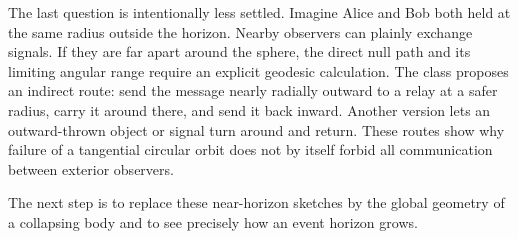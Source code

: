 The last question is intentionally less settled.  Imagine Alice and Bob both
held at the same radius outside the horizon.  Nearby observers can plainly
exchange signals.  If they are far apart around the sphere, the direct null
path and its limiting angular range require an explicit geodesic
calculation.  The class proposes an indirect route: send the message nearly
radially outward to a relay at a safer radius, carry it around there, and send
it back inward.  Another version lets an outward-thrown object or signal turn
around and return.  These routes show why failure of a tangential circular
orbit does not by itself forbid all communication between exterior
observers.

\begin{classroomqa}
\end{classroomqa}

The next step is to replace these near-horizon sketches by the global geometry
of a collapsing body and to see precisely how an event horizon grows.
